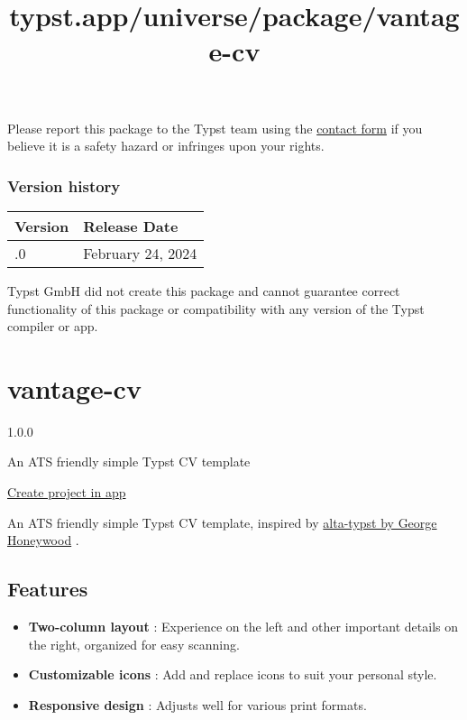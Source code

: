 Please report this package to the Typst team using the
\href{https://typst.app/contact}{contact form} if you believe it is a
safety hazard or infringes upon your rights.

\label{versions}
\subsubsection{Version history}\label{version-history}

\begin{longtable}[]{@{}ll@{}}
\toprule\noalign{}
Version & Release Date \\
\midrule\noalign{}
\endhead
\bottomrule\noalign{}
\endlastfoot
0.1.0 & February 24, 2024 \\
\end{longtable}

Typst GmbH did not create this package and cannot guarantee correct
functionality of this package or compatibility with any version of the
Typst compiler or app.


\title{typst.app/universe/package/vantage-cv}

\label{banner}
\label{template-thumbnail}

\section{vantage-cv}\label{vantage-cv}

{ 1.0.0 }

An ATS friendly simple Typst CV template

\href{/app?template=vantage-cv&version=1.0.0}{Create project in app}

\label{readme}
An ATS friendly simple Typst CV template, inspired by
\href{https://github.com/GeorgeHoneywood/alta-typst}{alta-typst by
George Honeywood} .

\subsection{Features}\label{features}

\begin{itemize}
\tightlist
\item
  \textbf{Two-column layout} : Experience on the left and other
  important details on the right, organized for easy scanning.
\item
  \textbf{Customizable icons} : Add and replace icons to suit your
  personal style.
\item
  \textbf{Responsive design} : Adjusts well for various print formats.
\end{itemize}

